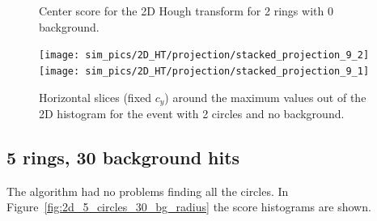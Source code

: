 \documentclass[11pt]{scrreprt}
\begin{document}
\begin{figure}[htp]
        \centering
        \caption{Center score for the 2D Hough transform for 2 rings with 0 background.}\label{fig:2d_ht_center}

        \texttt{[image: sim\_pics/2D\_HT/projection/stacked\_projection\_9\_2]}%
        \texttt{[image: sim\_pics/2D\_HT/projection/stacked\_projection\_9\_1]}
        \caption[Two slices out of the 2D histogram]{Horizontal slices (fixed $c_y$) around the maximum values out
        of the 2D histogram for the event with 2 circles and no background.}\label{fig:2d_slices}
\end{figure}


\subsection{5 rings, 30 background hits} %
\label{sub:2d_hough_transform_5_circles_30_background_hits}

The algorithm had no problems finding all the circles. In Figure~\ref{fig:2d_5_circles_30_bg_radius} the score histograms are shown.
\end{document}
